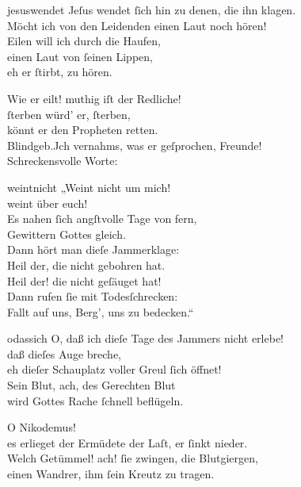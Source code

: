 \documentclass[abbrwidth=6em,tocstyle=ref-genre,toe=false]{ees}
\begin{document}
{\clearpage
\begin{movement}{jesuswendet}
  \voice[Blindgebohrner]
  Jeſus wendet ſich hin zu denen, die ihn klagen.\\
  Möcht ich von den Leidenden einen Laut noch hören!\\
  Eilen will ich durch die Haufen,\\
  einen Laut von ſeinen Lippen,\\
  eh er ſtirbt, zu hören.

  \voice[Joseph]
  Wie er eilt! muthig iſt der Redliche!\\
  ſterben würd’ er, ſterben,\\
  könnt er den Propheten retten.\\
  Blindgeb.Jch vernahms, was er geſprochen, Freunde!\\
  Schreckensvolle Worte:
\end{movement}

\begin{movement}{weintnicht}
  \voice[Blindgebohrner]
  „Weint nicht um mich!\\
  weint über euch!\\
  Es nahen ſich angſtvolle Tage von fern,\\
  Gewittern Gottes gleich.\\
  Dann hört man dieſe Jammerklage:\\
  Heil der, die nicht gebohren hat.\\
  Heil der! die nicht geſäuget hat!\\
  Dann rufen ſie mit Todesſchrecken:\\
  Fallt auf uns, Berg’, uns zu bedecken.“
\end{movement}

\begin{movement}{odassich}
  \voice[Nikodemus]
  O, daß ich dieſe Tage des Jammers nicht erlebe!\\
  daß dieſes Auge breche,\\
  eh dieſer Schauplatz voller Greul ſich öffnet!\\
  Sein Blut, ach, des Gerechten Blut\\
  wird Gottes Rache ſchnell beflügeln.

  \voice[Joseph]
  O Nikodemus!\\
  es erlieget der Ermüdete der Laſt, er ſinkt nieder.\\
  Welch Getümmel! ach! ſie zwingen, die Blutgiergen,\\
  einen Wandrer, ihm ſein Kreutz zu tragen.
\end{movement}

}
\end{document}
